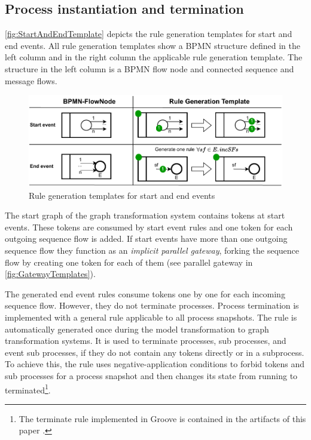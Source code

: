 \documentclass[submission, copyright, creativecommons]{eptcs}
\begin{document}
\subsection{Process instantiation and termination}
\autoref{fig:StartAndEndTemplate} depicts the rule generation templates for start and end events.
All rule generation templates show a BPMN structure defined in the left column and in the right column the applicable rule generation template.
The structure in the left column is a BPMN flow node and connected sequence and message flows.
\begin{figure}[h]
    \centering
    \includegraphics[width=1\textwidth]{images/start_end_template.pdf}
    \caption{Rule generation templates for start and end events}
    \label{fig:StartAndEndTemplate}
\end{figure}

The start graph of the graph transformation system contains tokens at start events.
These tokens are consumed by start event rules and one token for each outgoing sequence flow is added.
If start events have more than one outgoing sequence flow they function as an \textit{implicit parallel gateway}, forking the sequence flow by creating one token for each of them (see parallel gateway in \autoref{fig:GatewayTemplates}).

The generated end event rules consume tokens one by one for each incoming sequence flow.
However, they do not terminate processes.
Process termination is implemented with a general rule applicable to all process snapshots.
The rule is automatically generated once during the model transformation to graph transformation systems.
It is used to terminate processes, sub processes, and event sub processes, if they do not contain any tokens directly or in a subprocess.
To achieve this, the rule uses negative-application conditions to forbid tokens and sub processes for a process snapshot and then changes its state from running to terminated\footnote{The terminate rule implemented in Groove is contained in the artifacts of this paper \cite{timkrauterArtifactsTERMGRAPH2022}.}.
\end{document}
